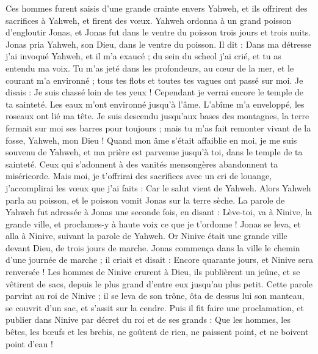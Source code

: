 \begin{multicols}{2}
Ces hommes furent saisis d’une grande crainte envers Yahweh, et ils offrirent des sacrifices à Yahweh, et firent des vœux.
Yahweh ordonna à un grand poisson d’engloutir Jonas, et Jonas fut dans le ventre du poisson trois jours et trois nuits.
\VerseOne{}Jonas pria Yahweh, son Dieu, dans le ventre du poisson.
Il dit : Dans ma détresse j’ai invoqué Yahweh, et il m'a exaucé ; du sein du scheol j’ai crié, et tu as entendu ma voix.
Tu m'as jeté dans les profondeurs, au cœur de la mer, et le courant m'a environné ; tous tes flots et toutes tes vagues ont passé sur moi.
Je disais : Je suis chassé loin de tes yeux ! Cependant je verrai encore le temple de ta sainteté.
Les eaux m'ont environné jusqu'à l'âme. L'abîme m'a enveloppé, les roseaux ont lié ma tête.
Je suis descendu jusqu'aux bases des montagnes, la terre fermait sur moi ses barres pour toujours ; mais tu m’as fait remonter vivant de la fosse, Yahweh, mon Dieu !
Quand mon âme s’était affaiblie en moi, je me suis souvenu de Yahweh, et ma prière est parvenue jusqu’à toi, dans le temple de ta sainteté.
Ceux qui s’adonnent à des vanités mensongères abandonnent ta miséricorde.
Mais moi, je t’offrirai des sacrifices avec un cri de louange, j’accomplirai les vœux que j’ai faits : Car le salut vient de Yahweh.
Alors Yahweh parla au poisson, et le poisson vomit Jonas sur la terre sèche.
\VerseOne{}La parole de Yahweh fut adressée à Jonas une seconde fois, en disant :
Lève-toi, va à Ninive, la grande ville, et proclames-y à haute voix ce que je t'ordonne !
Jonas se leva, et alla à Ninive, suivant la parole de Yahweh. Or Ninive était une grande ville devant Dieu, de trois jours de marche.
Jonas commença dans la ville le chemin d'une journée de marche ; il criait et disait : Encore quarante jours, et Ninive sera renversée !
Les hommes de Ninive crurent à Dieu, ils publièrent un jeûne, et se vêtirent de sacs, depuis le plus grand d'entre eux jusqu'au plus petit.
Cette parole parvint au roi de Ninive ; il se leva de son trône, ôta de dessus lui son manteau, se couvrit d'un sac, et s'assit sur la cendre.
Puis il fit faire une proclamation, et publier dans Ninive par décret du roi et de ses grands : Que les hommes, les bêtes, les bœufs et les brebis, ne goûtent de rien, ne paissent point, et ne boivent point d'eau !

\end{multicols}
